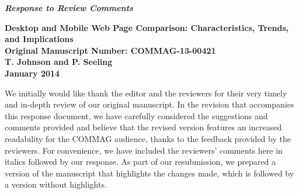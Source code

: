 \documentclass[11pt, draftclsnofoot, onecolumn]{IEEEtran}
\begin{document}
\begin{center}
\begin{large}
\textit{\bf Response to Review Comments}
\end{large}
\end{center}

\begin{center}
\begin{large}
{\bf Desktop and Mobile Web Page Comparison: Characteristics, Trends, and Implications} \\
{\bf Original Manuscript Number: COMMAG-13-00421} \\


{\bf T. Johnson and P. Seeling} \\
{\bf January 2014}  \\

\end{large}
\end{center}

We initially would like  thank the editor and the reviewers for their very timely and in-depth review of our original manuscript.
In the revision that accompanies this response document, we have carefully considered the suggestions and comments provided and believe that the revised version features an increased readability for the COMMAG audience, thanks to the feedback provided by the reviewers.
For convenience, we have included the reviewers' comments here in italics followed by our response. As part of our resubmission, we prepared a version of the manuscript that highlights the changes made, which is followed by a version without highlights.\\
\end{document}
